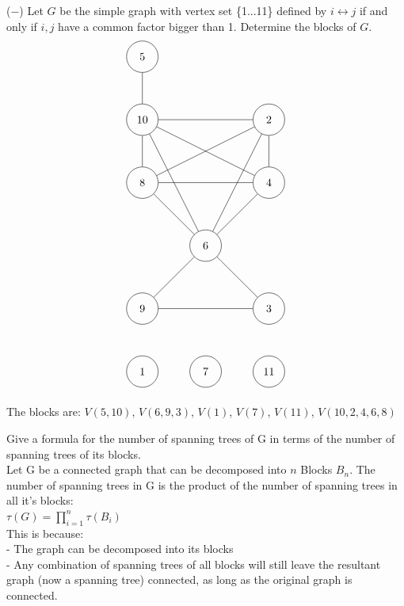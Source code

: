 \documentclass[12pt]{article}
\newenvironment{question}[2][Question]{\begin{trivlist}
\item[\hskip \labelsep {\bfseries #1}\hskip \labelsep {\bfseries #2.}]}{\end{trivlist}}
\begin{document}
\begin{question}{4}
($-$) Let $G$ be the simple graph with vertex set \{1...11\} defined by $i \leftrightarrow j$ if and only if $i, j$ have a common factor bigger than 1.  Determine the blocks of $G$.
\begin{align*}
\begin{tikzpicture}
\node[shape=circle,draw=black,minimum size=1cm] (A) at (0,10) {5};
\node[shape=circle,draw=black,minimum size=1cm] (B) at (0,8) {10};
\node[shape=circle,draw=black,minimum size=1cm] (C) at (4,8) {2};
\node[shape=circle,draw=black,minimum size=1cm] (D) at (0,6) {8};
\node[shape=circle,draw=black,minimum size=1cm] (E) at (4,6) {4};
\node[shape=circle,draw=black,minimum size=1cm] (F) at (2,4) {6};
\node[shape=circle,draw=black,minimum size=1cm] (G) at (0,2) {9};
\node[shape=circle,draw=black,minimum size=1cm] (H) at (4,2) {3};
\node[shape=circle,draw=black,minimum size=1cm] (I) at (0,0) {1};
\node[shape=circle,draw=black,minimum size=1cm] (I) at (2,0) {7};
\node[shape=circle,draw=black,minimum size=1cm] (I) at (4,0) {11};
\path [] (A) edge node[left] {} (B);
\path [] (B) edge node[left] {} (C);
\path [] (B) edge node[left] {} (D);
\path [] (B) edge node[left] {} (E);
\path [] (B) edge node[left] {} (F);
\path [] (C) edge node[left] {} (D);
\path [] (C) edge node[left] {} (E);
\path [] (C) edge node[left] {} (F);
\path [] (D) edge node[left] {} (E);
\path [] (D) edge node[left] {} (F);
\path [] (E) edge node[left] {} (F);
\path [] (F) edge node[left] {} (G);
\path [] (F) edge node[left] {} (H);
\path [] (G) edge node[left] {} (H);
\end{tikzpicture}
\end{align*}

The blocks are: $V(5, 10) $, $V(6,9,3)$, $V(1)$, $V(7)$, $V(11)$, $V(10,2,4,6,8)$
\end{question}

\begin{question}{5}
	Give a formula for the number of spanning trees of G in terms of the number of spanning trees of its blocks.	\\
	Let G be a connected graph that can be decomposed into $n$ Blocks $B_n$. The number of spanning trees in G is the product of the number of spanning trees in all it's blocks: \\

	$\tau(G) = \prod_{i=1}^{n}\tau(B_i)$\\
	This is because:\\
	- The graph can be decomposed into its blocks\\
	- Any combination of spanning trees of all blocks will still leave the resultant graph (now a spanning tree) connected, as long as the original graph is connected.
\end{question}
\end{document}
